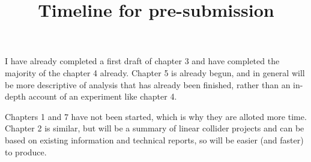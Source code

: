 \documentclass{article}
\title{Timeline for pre-submission}
\date{}
\begin{document}
\maketitle

\vspace{-1.5cm}

I have already completed a first draft of chapter 3 and have completed the majority of the chapter 4 already. Chapter 5 is already begun, and in general will be more descriptive of analysis that has already been finished, rather than an in-depth account of an experiment like chapter 4. 

Chapters 1 and 7 have not been started, which is why they are alloted more time. Chapter 2 is similar, but will be a summary of linear collider projects and can be based on existing information and technical reports, so will be easier (and faster) to produce. 

\vspace{0.5cm}

\begin{figure}[H]
\centering
{}
\end{figure}
\end{document}
